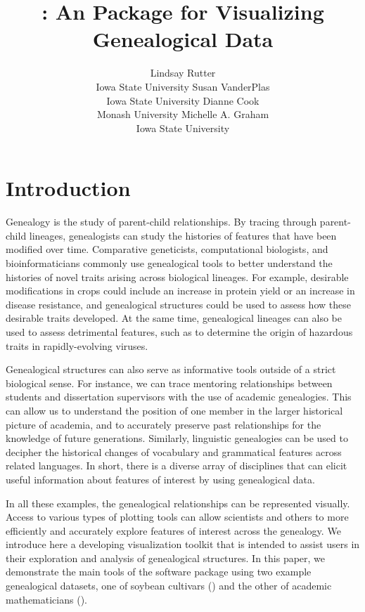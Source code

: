 \documentclass[article,shortnames]{jss}
\author{Lindsay Rutter\\Iowa State University \And
        Susan VanderPlas\\Iowa State University \And
        Dianne Cook\\Monash University\And
        Michelle A. Graham\\Iowa State University}
\title{\pkg{ggenealogy}: An \proglang{R} Package for Visualizing Genealogical Data}
\begin{document}


\section{Introduction}

Genealogy is the study of parent-child relationships. By tracing through parent-child lineages, genealogists can study the histories of features that have been modified over time. Comparative geneticists, computational biologists, and bioinformaticians commonly use genealogical tools to better understand the histories of novel traits arising across biological lineages. For example, desirable modifications in crops could include an increase in protein yield or an increase in disease resistance, and genealogical structures could be used to assess how these desirable traits developed. At the same time, genealogical lineages can also be used to assess detrimental features, such as to determine the origin of hazardous traits in rapidly-evolving viruses.

Genealogical structures can also serve as informative tools outside of a strict biological sense. For instance, we can trace mentoring relationships between students and dissertation supervisors with the use of academic genealogies. This can allow us to understand the position of one member in the larger historical picture of academia, and to accurately preserve past relationships for the knowledge of future generations. Similarly, linguistic genealogies can be used to decipher the historical changes of vocabulary and grammatical features across related languages. In short, there is a diverse array of disciplines that can elicit useful information about features of interest by using genealogical data.

In all these examples, the genealogical relationships can be represented visually. Access to various types of plotting tools can allow scientists and others to more efficiently and accurately explore features of interest across the genealogy. We introduce here a developing visualization toolkit that is intended to assist users in their exploration and analysis of genealogical structures. In this paper, we demonstrate the main tools of the software package  using two example genealogical datasets, one of soybean cultivars (\citealt{soybean}) and the other of academic mathematicians (\citealt{mgp}).
\end{document}

